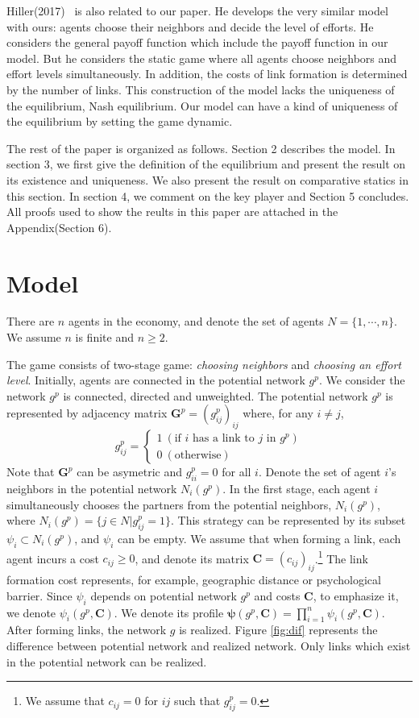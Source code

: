 \documentclass[12pt]{article}
\theoremstyle{definition}
\begin{document}
Hiller(2017)~\cite{hiller} is also related to our paper.
He develops the very similar model with ours: agents choose their neighbors and decide the level of efforts.
He considers the general payoff function which include the payoff function in our model.
But he considers the static game where all agents choose neighbors and effort levels simultaneously.
In addition, the costs of link formation is determined by the number of links.
This construction of the model lacks the uniqueness of the equilibrium, Nash equilibrium.
Our model can have a kind of uniqueness of the equilibrium by setting the game dynamic.

The rest of the paper is organized as follows.
Section 2 describes the model.
In section 3, we first give the definition of the equilibrium and present the result on its existence and uniqueness.
We also present the result on comparative statics in this section.
In section 4, we comment on the key player and Section 5 concludes.
All proofs used to show the reults in this paper are attached in the Appendix(Section 6).


\section{Model}

There are $n$ agents in the economy, and denote the set of agents $N = \{ 1, \cdots, n\}$.
We assume $n$ is finite and $n \ge 2$.

The game consists of two-stage game: {\it{choosing neighbors}} and {\it{choosing an effort level}}.
Initially, agents are connected in the potential network $g^p$.
We consider the network $g^p$ is connected, directed and unweighted.
The potential network $g^p$ is represented by adjacency matrix $\bm{G}^p = {(g_{ij}^p)}_{ij}$ where, for any $i \neq j$,
\[ g_{ij}^p =
	\begin{cases}
		1 \  (\text{if $i$ has a link to $j$ in $g^p $}) \\
		0 \  (\text{otherwise})
	\end{cases} \]
Note that $\bm{G}^p$ can be asymetric and $g_{ii}^p = 0$ for all $i$.
Denote the set of agent $i$'s neighbors in the potential network $N_i(g^p)$.
In the first stage, each agent $i$ simultaneously chooses the partners from the potential neighbors, $N_i(g^p)$, where $N_i(g^p) = \{ j \in N | g_{ij}^p = 1 \}$.
This strategy can be represented by its subset $\psi_i \subset N_i(g^p)$, and $\psi_i$ can be empty.
We assume that when forming a link, each agent incurs a cost $c_{ij} \ge 0$, and denote its matrix $\bm{C} = {(c_{ij})}_{ij}$.\footnote{We assume that $c_{ij} = 0$ for $ij$ such that $g_{ij}^p = 0$.}
The link formation cost represents, for example, geographic distance or psychological barrier.
Since $\psi_i$ depends on potential network $g^p$ and costs $\bm{C}$, to emphasize it, we denote $\psi_i(g^p, \bm{C})$.
We denote its profile $\bm{\psi}(g^p, \bm{C}) = \prod_{i=1}^n \psi_i(g^p, \bm{C})$.
After forming links, the network $g$ is realized.
Figure \ref{fig:dif} represents the difference between potential network and realized network.
Only links which exist in the potential network can be realized.
\end{document}
